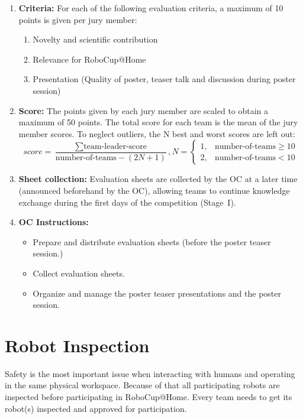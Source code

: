 \begin{enumerate}
	\item \textbf{Criteria:} For each of the following evaluation criteria, a maximum of 10 points is given per jury member:
	\begin{enumerate}
		\item Novelty and scientific contribution
		\item Relevance for RoboCup@Home
		\item Presentation (Quality of poster, teaser talk and discussion during poster session)
	\end{enumerate}
	\item \textbf{Score:} The points given by each jury member are scaled to obtain a maximum of 50 points. The total score for each team is the mean of the jury member scores. To neglect outliers, the N best and worst scores are left out:
	$$
	score=\frac{\sum \text{team-leader-score}}{\text{number-of-teams}-\left ( 2N+1  \right )},N=\left\{\begin{matrix}
	1, & \text{number-of-teams} \geq 10\\ 
	2, & \text{number-of-teams} < 10
	\end{matrix}\right.
	$$
	\item \textbf{Sheet collection:} Evaluation sheets are collected by the OC at a later time (announced beforehand by the OC), allowing teams to continue knowledge exchange during the first days of the competition (Stage~I).
	\item \textbf{OC Instructions:}
	\begin{itemize}
		\item Prepare and distribute evaluation sheets (before the poster teaser session.)
		\item Collect evaluation sheets.
		\item Organize and manage the poster teaser presentations and the poster session.
	\end{itemize}
\end{enumerate}

\section{Robot Inspection}
\label{sec:robot_inspection}
Safety is the most important issue when interacting with humans and operating in the same physical workspace. Because of that all participating robots are inspected before participating in RoboCup@Home. Every team needs to get its robot(s) inspected and approved for participation.

